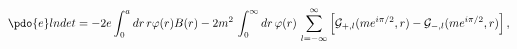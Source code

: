 \begin{equation}
\label{Eq_0219}
\pdo{e} lndet = -2e \int^{a}_{0} dr \, r \varphi(r) B(r)
  -2 m^2 \, \int^{\infty}_0 dr \, \varphi(r) \,
  \sum^{\infty}_{l=-\infty}
  \left[
  \mathcal{G}_{+,l} (me^{i\pi/2},r) - \mathcal{G}_{-,l} (me^{i\pi/2},r)
  \right],
\end{equation}

